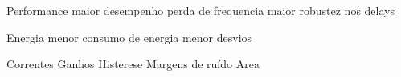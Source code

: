 \documentclass[pgmicro,mestrado,english]{iiufrgs}
\begin{document}
Performance
    maior desempenho
    perda de frequencia
    maior robustez nos delays

Energia
    menor consumo de energia
    menor desvios

Correntes
Ganhos
Histerese
Margens de ruído
Area












\end{document}

